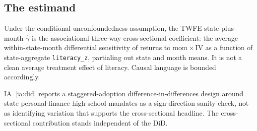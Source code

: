 \subsection{The estimand}

Under the conditional-unconfoundedness assumption, the TWFE state-plus-month $\hat\gamma$ is the associational three-way cross-sectional coefficient: the average within-state-month differential sensitivity of returns to $\mathrm{mom}\times\mathrm{IV}$ as a function of state-aggregate \texttt{literacy\_z}, partialing out state and month means. It is not a clean average treatment effect of literacy. Causal language is bounded accordingly.

IA~\ref{ia:did} reports a staggered-adoption difference-in-differences design around state personal-finance high-school mandates as a sign-direction sanity check, not as identifying variation that supports the cross-sectional headline. The cross-sectional contribution stands independent of the DiD.
